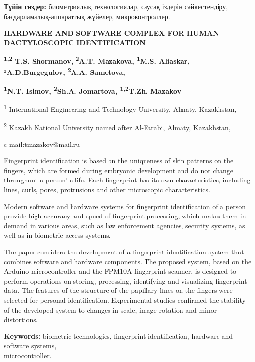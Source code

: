 {\bfseries Түйін сөздер:} биометриялық технологиялар, саусақ іздерін
сәйкестендіру, \\бағдарламалық-аппараттық жүйелер, микроконтроллер.

\begin{articleheader}
{\bfseries HARDWARE AND SOFTWARE COMPLEX FOR HUMAN DACTYLOSCOPIC
IDENTIFICATION}

{\bfseries \textsuperscript{1,2} T.S. Shormanov, \textsuperscript{2}A.T.
Mazakova, \textsuperscript{1}M.S. Aliaskar, ²A.D.Burgegulov,
\textsuperscript{2}A.A. Sametova,}

{\bfseries \textsuperscript{1}N.T. Isimov, \textsuperscript{2}Sh.A.
Jomartova, \textsuperscript{1,2}T.Zh. Mazakov\textsuperscript{\envelope }}
\end{articleheader}

\begin{affiliation}
\textsuperscript{1} International Engineering and Technology University,
Almaty, Kazakhstan,

\textsuperscript{2} Kazakh National University named after Al-Farabi,
Almaty, Kazakhstan,

e-mail:tmazakov@mail.ru
\end{affiliation}

Fingerprint identification is based on the uniqueness of skin patterns
on the fingers, which are formed during embryonic development and do not
change throughout a person' s life. Each fingerprint has
its own characteristics, including lines, curls, pores, protrusions and
other microscopic characteristics.

Modern software and hardware systems for fingerprint identification of a
person provide high accuracy and speed of fingerprint processing, which
makes them in demand in various areas, such as law enforcement agencies,
security systems, as well as in biometric access systems.

The paper considers the development of a fingerprint identification
system that combines software and hardware components. The proposed
system, based on the Arduino microcontroller and the FPM10A fingerprint
scanner, is designed to perform operations on storing, processing,
identifying and visualizing fingerprint data. The features of the
structure of the papillary lines on the fingers were selected for
personal identification. Experimental studies confirmed the stability of
the developed system to changes in scale, image rotation and minor
distortions.

{\bfseries Keywords:} biometric technologies, fingerprint identification,
hardware and software systems, \\microcontroller.

